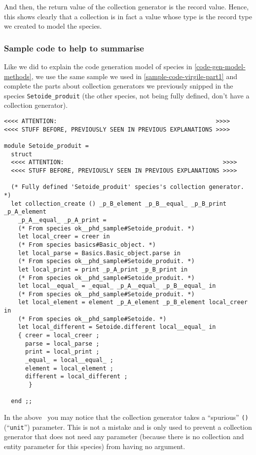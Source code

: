 And then, the return value of the collection generator is the record
value. Hence, this shows clearly that a collection is in fact a value
whose type is the record type we created to model the species.


\subsubsection{Sample code to help to summarise}
Like we did to explain the code generation model of species in
\ref{code-gen-model-methods}, we use the same sample we used in
\ref{sample-code-virgile-part1} and complete the parts about
collection generators we previously snipped in the species
{\tt Setoide\_produit} (the other species, not being fully defined,
don't have a collection generator).

{\footnotesize
\begin{lstlisting}[language=MyOCaml]
<<<< ATTENTION:                                             >>>>
<<<< STUFF BEFORE, PREVIOUSLY SEEN IN PREVIOUS EXPLANATIONS >>>>

module Setoide_produit =
  struct
  <<<< ATTENTION:                                             >>>>
  <<<< STUFF BEFORE, PREVIOUSLY SEEN IN PREVIOUS EXPLANATIONS >>>>

  (* Fully defined 'Setoide_produit' species's collection generator. *)
  let collection_create () _p_B_element _p_B__equal_ _p_B_print _p_A_element
    _p_A__equal_ _p_A_print =
    (* From species ok__phd_sample#Setoide_produit. *)
    let local_creer = creer in
    (* From species basics#Basic_object. *)
    let local_parse = Basics.Basic_object.parse in
    (* From species ok__phd_sample#Setoide_produit. *)
    let local_print = print _p_A_print _p_B_print in
    (* From species ok__phd_sample#Setoide_produit. *)
    let local__equal_ = _equal_ _p_A__equal_ _p_B__equal_ in
    (* From species ok__phd_sample#Setoide_produit. *)
    let local_element = element _p_A_element _p_B_element local_creer in
    (* From species ok__phd_sample#Setoide. *)
    let local_different = Setoide.different local__equal_ in
    { creer = local_creer ;
      parse = local_parse ;
      print = local_print ;
      _equal_ = local__equal_ ;
      element = local_element ;
      different = local_different ;
       }
    
  end ;;
\end{lstlisting}
}

\label{point-the-extra-unit-parameter-need}
In the above \ocaml\ you may notice that the collection generator
takes a ``spurious'' {\tt ()} (``{\tt unit}'') parameter. This is not
a mistake and is only used to prevent a collection generator that does
not need any parameter (because there is no collection and entity
parameter for this species) from having no argument.

